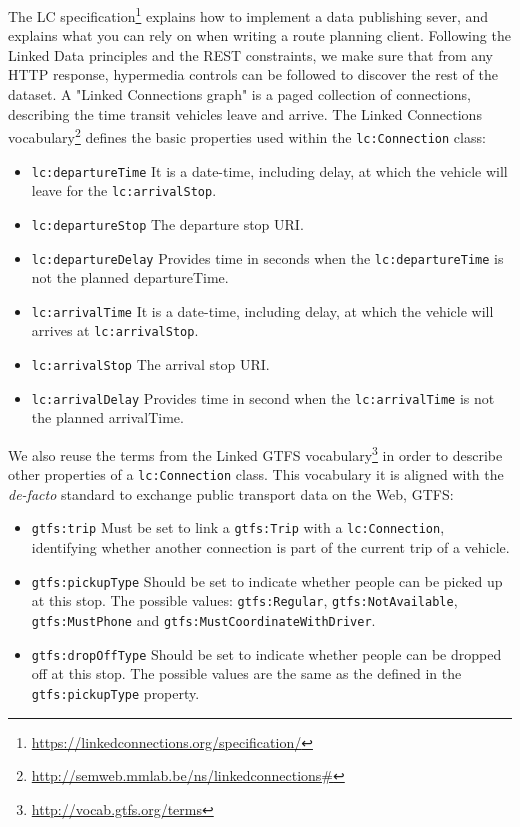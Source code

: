 \documentclass[sw]{iosart2x}
\begin{document}
	The LC specification\footnote{\url{https://linkedconnections.org/specification/}} explains how to implement a data publishing sever, and explains what you can rely on when writing a route planning client. Following the Linked Data principles and the REST constraints, we make sure that from any HTTP response, hypermedia controls can be followed to discover the rest of the dataset. A "Linked Connections graph" is a paged collection of connections, describing the time transit vehicles leave and arrive. The Linked Connections vocabulary\footnote{\url{http://semweb.mmlab.be/ns/linkedconnections\#}} defines the basic properties used within the \texttt{lc:Connection} class:
	\begin{itemize}
		\item \texttt{lc:departureTime} It is a date-time, including delay, at which the vehicle will leave for the \texttt{lc:arrivalStop}.
		\item \texttt{lc:departureStop} The departure stop URI.
		\item \texttt{lc:departureDelay} Provides time in seconds when the \texttt{lc:departureTime} is not the planned departureTime.
		\item \texttt{lc:arrivalTime} It is a date-time, including delay, at which the vehicle will arrives at \texttt{lc:arrivalStop}.
		\item \texttt{lc:arrivalStop} The arrival stop URI.
		\item \texttt{lc:arrivalDelay} Provides time in second when the \texttt{lc:arrivalTime} is not the planned arrivalTime.
	\end{itemize}
	
	We also reuse the terms from the Linked GTFS vocabulary\footnote{\url{http://vocab.gtfs.org/terms}} in order to describe other properties of a \texttt{lc:Connection} class. This vocabulary it is aligned with the \textit{de-facto} standard to exchange public transport data on the Web, GTFS:
	
	\begin{itemize}
	\item \texttt{gtfs:trip} Must be set to link a \texttt{gtfs:Trip} with a \texttt{lc:Connection}, identifying whether another connection is part of the current trip of a vehicle.
	\item \texttt{gtfs:pickupType} Should be set to indicate whether people can be picked up at this stop. The possible values: \texttt{gtfs:Regular}, \texttt{gtfs:NotAvailable}, \texttt{gtfs:MustPhone} and \texttt{gtfs:MustCoordinateWithDriver}.
	\item \texttt{gtfs:dropOffType} Should be set to indicate whether people can be dropped off at this stop. The possible values are the same as the defined in the \texttt{gtfs:pickupType} property.
	\end{itemize}
	
\end{document}

